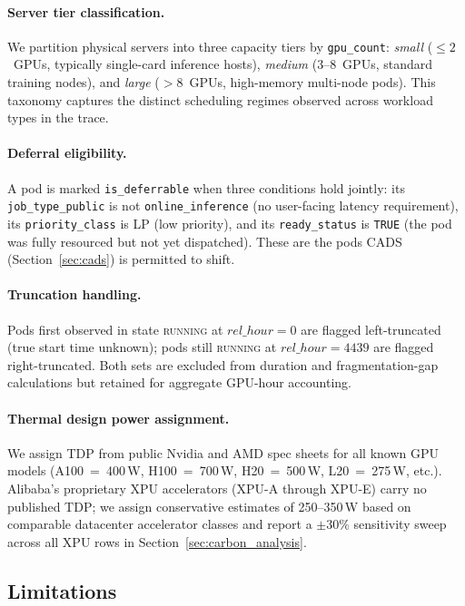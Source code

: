 \paragraph{Server tier classification.}
We partition physical servers into three capacity tiers by \texttt{gpu\_count}:
\emph{small} ($\leq 2$~GPUs, typically single-card inference hosts),
\emph{medium} ($3$--$8$~GPUs, standard training nodes),
and \emph{large} ($>8$~GPUs, high-memory multi-node pods).
This taxonomy captures the distinct scheduling regimes observed across
workload types in the trace.

\paragraph{Deferral eligibility.}
A pod is marked \texttt{is\_deferrable} when three conditions hold jointly:
its \texttt{job\_type\_public} is not \texttt{online\_inference} (no
user-facing latency requirement), its \texttt{priority\_class} is LP
(low priority), and its \texttt{ready\_status} is \texttt{TRUE} (the pod
was fully resourced but not yet dispatched).
These are the pods CADS (Section~\ref{sec:cads}) is permitted to shift.

\paragraph{Truncation handling.}
Pods first observed in state \textsc{running} at $\mathit{rel\_hour}=0$
are flagged left-truncated (true start time unknown); pods still
\textsc{running} at $\mathit{rel\_hour}=4439$ are flagged right-truncated.
Both sets are excluded from duration and fragmentation-gap calculations
but retained for aggregate GPU-hour accounting.

\paragraph{Thermal design power assignment.}
We assign TDP from public Nvidia and AMD spec sheets for all known GPU
models (A100~=~400\,W, H100~=~700\,W, H20~=~500\,W, L20~=~275\,W, etc.).
Alibaba's proprietary XPU accelerators (XPU-A through XPU-E) carry no
published TDP; we assign conservative estimates of 250--350\,W based on
comparable datacenter accelerator classes and report a $\pm30\%$
sensitivity sweep across all XPU rows in
Section~\ref{sec:carbon_analysis}.

\subsection{Limitations}
\label{sec:dataset:limitations}

